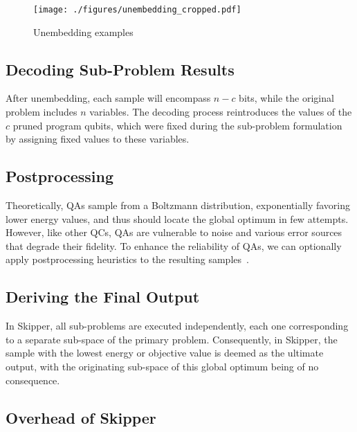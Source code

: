 \begin{figure}[h]
    \centering
    \texttt{[image: ./figures/unembedding\_cropped.pdf]}
    \caption{  
Unembedding examples
    }
    \label{fig:unembedding_example} 
\end{figure}  



\subsection{Decoding Sub-Problem Results}

After unembedding, each sample will encompass $n-c$ bits, while the original problem includes $n$ variables. 
The decoding process reintroduces the values of the $c$ pruned program qubits,
which were fixed during the sub-problem formulation by assigning fixed values to these variables. 


\subsection{Postprocessing}

Theoretically, QAs sample from a Boltzmann distribution, exponentially favoring lower energy values, and thus should locate the global optimum in few attempts. 
However, like other QCs, QAs are vulnerable to noise and various error sources that degrade their fidelity. 
To enhance the reliability of QAs, we can optionally apply postprocessing heuristics to the resulting samples~\cite{ayanzadeh2021multi}.

\subsection{Deriving the Final Output}
In Skipper, all sub-problems are executed independently, each one corresponding to a separate sub-space of the primary problem. 
Consequently, in Skipper, the sample with the lowest energy or objective value is deemed as the ultimate output, with the originating sub-space of this global optimum being of no consequence.



\subsection{Overhead of Skipper}

